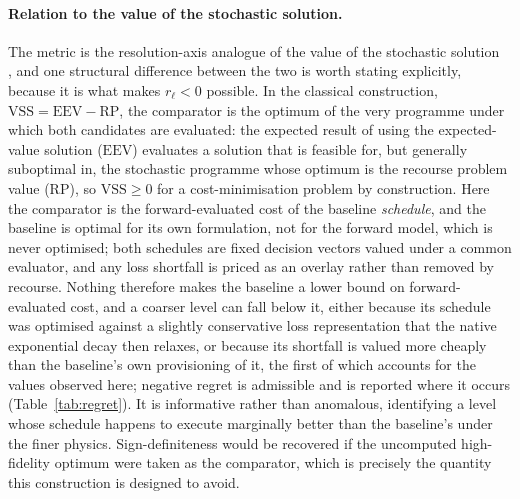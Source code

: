 \documentclass[a4paper,fleqn]{cas-sc}
\providecommand{\DIFadd}[1]{{\protect\color[HTML]{1A5FB4} #1}} %
\providecommand{\DIFaddbegin}{} %
\newcommand{\DIFaddincludegraphics}[2][]{{\color{blue}\fbox{\DIFOincludegraphics[#1]{#2}}}} %
\DeclareRobustCommand{\DIFaddbegin}{\DIFOaddbegin \let\includegraphics\DIFaddincludegraphics} %
\begin{document}
\DIFaddbegin \paragraph{\DIFadd{Relation to the value of the stochastic solution.}}
\DIFadd{The metric is the resolution-axis analogue of the value of the stochastic
solution~}\citep{BirgeLouveaux2011}\DIFadd{, and one structural difference between the two is worth
stating explicitly, because it is what makes \(r_\ell<0\) possible. In the classical
construction, \(\mathrm{VSS}=\mathrm{EEV}-\mathrm{RP}\), the comparator is the optimum of the
very programme under which both candidates are evaluated: the expected result of using the
expected-value solution (\(\mathrm{EEV}\)) evaluates a solution that is feasible for, but
generally suboptimal in, the stochastic programme whose optimum is the recourse problem value
(\(\mathrm{RP}\)), so \(\mathrm{VSS}\ge 0\) for a cost-minimisation problem by
construction. Here the comparator is the forward-evaluated cost of the baseline
\emph{schedule}, and the baseline is optimal for its own formulation, not for the forward
model, which is never optimised; both schedules are fixed decision vectors valued under a
common evaluator, and any loss shortfall is priced as an overlay rather than removed by
recourse. Nothing therefore makes the baseline a lower bound on forward-evaluated cost, and a
coarser level can fall below it, either because its schedule was optimised against a slightly
conservative loss representation that the native exponential decay then relaxes, or because
its shortfall is valued more cheaply than the baseline's own provisioning of it, the first of
which accounts for the values observed here; negative
regret is admissible and is reported where it occurs (Table~\ref{tab:regret}). It is
informative rather than anomalous, identifying a level whose schedule happens to execute
marginally better than the baseline's under the finer physics. Sign-definiteness would be
recovered if the uncomputed high-fidelity optimum were taken as the comparator, which is
precisely the quantity this construction is designed to avoid.
}
\end{document}
